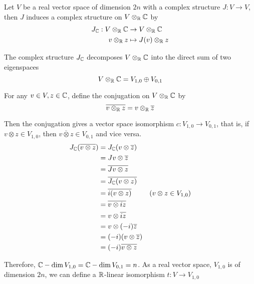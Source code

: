 \begin{remark}
	Let $V$ be a real vector space of dimension $2n$ with a complex structure $J: V \to V$, then $J$ induces a complex structure on $V \otimes_{\mathbb{R}} \mathbb{C}$ by
	\begin{align*}
		J_{\mathbb{C}}: V \otimes_{\mathbb{R}} \mathbb{C} &\to V \otimes_{\mathbb{R}} \mathbb{C} \\
		v \otimes_{\mathbb{R}} z &\mapsto J(v) \otimes_{\mathbb{R}} z
	\end{align*}

	The complex structure $J_{\mathbb{C}}$ decomposes $V \otimes_{\mathbb{R}} \mathbb{C}$ into the direct sum of two eigenspaces
	$$
		V \otimes_{\mathbb{R}} \mathbb{C} = V_{1,0} \oplus V_{0,1}
	$$
	
	For any $v \in V, z \in \mathbb{C}$, define the conjugation on $V \otimes_{\mathbb{R}} \mathbb{C}$ by 
	$$
		\overline{v \otimes_{\mathbb{R}} z} = v \otimes_{\mathbb{R}} \overline{z}
	$$
	
	Then the conjugation gives a vector space isomorphism $c: V_{1,0} \to V_{0,1}$, that is, if $v \otimes z \in V_{1,0}$, then $\overline{v \otimes z} \in V_{0,1}$ and vice versa.
	\begin{align*}
		J_{\mathbb{C}}(\overline{v \otimes z}) 
		&= J_{\mathbb{C}}(v \otimes \overline{z}) \\
		&= Jv \otimes \overline{z} \\
		&= \overline{Jv \otimes z} \\
		&= \overline{J_{\mathbb{C}}(v \otimes z)} \\
		&= \overline{i(v \otimes z)} &\text{($v \otimes z \in V_{1,0}$)}\\
		&= \overline{v \otimes i z} \\
		&= v \otimes \overline{i z} \\
		&= v \otimes (-i) \overline{z} \\
		&= (-i) (v \otimes \overline{z}) \\
		&= (-i) \overline{v \otimes z}
	\end{align*}
	
	Therefore, $\mathbb{C}-\dim V_{1,0} = \mathbb{C}-\dim V_{0,1} = n$. As a real vector space, $V_{1,0}$ is of dimension $2n$, we can define a $\mathbb{R}$-linear isomorphism $t: V \to V_{1,0}$
	\begin{center}
	\end{center}
	

\end{remark}
